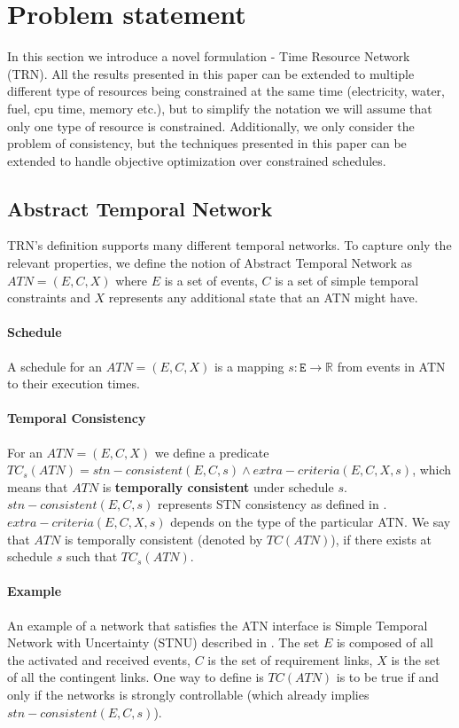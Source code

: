 \section{Problem statement}
In this section we introduce a novel formulation - Time Resource Network (TRN). All the results presented in this paper can be extended to multiple different type of resources being constrained at the same time (electricity, water, fuel, cpu time, memory etc.), but to simplify the notation we will assume that only one type of resource is constrained. Additionally, we only consider the problem of consistency, but the techniques presented in this paper can be extended to handle objective optimization over constrained schedules.

\subsection{Abstract Temporal Network}
TRN's definition supports many different temporal networks. To capture only the relevant properties, we define the notion of Abstract Temporal Network as $ATN=(E, C, X)$ where $E$ is a set of events, $C$ is a set of simple temporal constraints \cite{dechter1991temporal} and $X$ represents any additional state that an ATN might have.

\paragraph{Schedule}
A schedule for an $ATN=(E,C,X)$ is a mapping $s: \texttt{E} \rightarrow \mathbb{R}$ from events in ATN to their execution times.

\paragraph{Temporal Consistency}
\label{temporal_consistency}
For an $ATN=(E,C,X)$ we define a predicate $TC_s(ATN) = stn-consistent(E,C,s) \wedge extra-criteria(E,C,X,s)$, which means that $ATN$ is \textbf{temporally consistent} under schedule $s$. $stn-consistent(E,C,s)$ represents STN consistency as defined in \cite{dechter1991temporal}.  $extra-criteria(E,C,X,s)$ depends on the type of the particular ATN. We say that $ATN$ is temporally consistent (denoted by $TC(ATN)$), if there exists at schedule $s$ such that $TC_s(ATN)$.

\paragraph{Example}
An example of a network that satisfies the ATN interface is Simple Temporal Network with Uncertainty (STNU) described in \cite{vidal1996dealing}. The set $E$ is composed of all the activated and received events, $C$ is the set of requirement links, $X$ is the set of all the contingent links. One way to define is $TC(ATN)$ is to be true if and only if the networks is strongly controllable (which already implies $stn-consistent(E,C,s)$).

